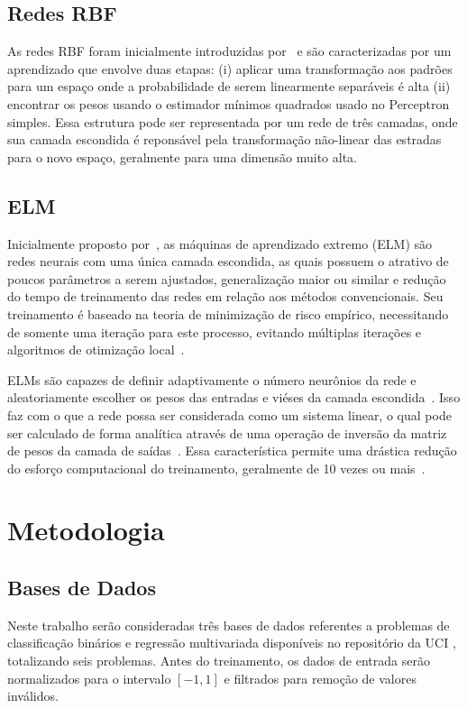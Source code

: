 \documentclass[conference]{IEEEtran}
\begin{document}
	\subsection{Redes RBF}
	As redes RBF foram inicialmente introduzidas por~\cite{broomhead1988multivariablefi} e são caracterizadas por um aprendizado que envolve duas etapas: (i) aplicar uma transformação aos padrões para um espaço onde a probabilidade de serem linearmente separáveis é alta (ii) encontrar os pesos usando o estimador mínimos quadrados usado no Perceptron simples. Essa estrutura pode ser representada por um rede de três camadas, onde sua camada escondida é reponsável pela transformação não-linear das estradas para o novo espaço, geralmente para uma dimensão muito alta. 
	
	\subsection{ELM}	
	Inicialmente proposto por~\cite{huang2004extreme}, as máquinas de aprendizado extremo (ELM) são redes neurais com uma única camada escondida, as quais possuem o atrativo de poucos parâmetros a serem ajustados, generalização maior ou similar e redução do tempo de treinamento das redes em relação aos métodos convencionais. Seu treinamento é baseado na teoria de minimização de risco empírico, necessitando de somente uma iteração para este processo, evitando múltiplas iterações e algoritmos de otimização local~\cite{ding2015extreme}. 
	
	ELMs são capazes de definir adaptivamente o número neurônios da rede e aleatoriamente escolher os pesos das entradas e viéses da camada escondida~\cite{huang2006extreme}. Isso faz com o que a rede possa ser considerada como um sistema linear, o qual pode ser calculado de forma analítica através de uma operação de inversão da matriz de pesos da camada de saídas~\cite{huang2006extreme}. Essa característica permite uma drástica redução do esforço computacional do treinamento, geralmente de 10 vezes ou mais~\cite{deng2010research}. 
	
	\section{Metodologia}
	\subsection{Bases de Dados}
	Neste trabalho serão consideradas três bases de dados referentes a problemas de classificação binários e regressão multivariada disponíveis no repositório da UCI \cite{dua2019}, totalizando seis problemas. Antes do treinamento, os dados de entrada serão normalizados para o intervalo $[-1,1]$ e filtrados para remoção de valores inválidos.
	
\end{document}
